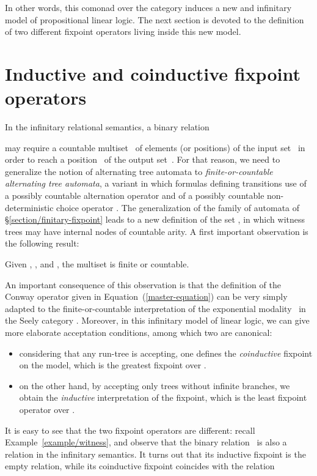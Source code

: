 \documentclass[runningheads,a4paper]{llncs}
\begin{document}
\noindent
In other words, this comonad  over the category  induces a new and infinitary model of propositional linear logic. 
The next section is devoted to the definition of two different fixpoint operators living inside this new model.



\section{Inductive and coinductive fixpoint operators}\label{section/inductive-and-coinductive}
In the infinitary relational semantics, a binary relation 

may require a countable multiset~ of elements (or positions) of the input set~
in order to reach a position~ of the output set~. 
For that reason, we need to generalize the notion of alternating tree automata to \emph{finite-or-countable alternating tree automata}, 
a variant in which formulas defining transitions use of a possibly countable alternation operator  
and of a possibly countable non-deterministic choice operator .
The generalization of the family of automata  of \S\ref{section/finitary-fixpoint} leads to a new definition of the set , in which witness trees may have internal nodes of countable arity.
A first important observation is the following result:

\begin{property}
Given , , and , the multiset  is finite or countable.
\end{property}
An important consequence of this observation is that the definition of the Conway operator  given in Equation~(\ref{master-equation}) 
can be very simply adapted to the finite-or-countable interpretation of the exponential modality~ in the Seely category .
Moreover, in this infinitary model of linear logic, we can give more elaborate acceptation conditions, among which two are canonical:
\begin{itemize}
\item considering that any run-tree is accepting, one defines the \emph{coinductive} fixpoint on the model, which is the greatest fixpoint over .
\item on the other hand, by accepting only trees without infinite branches, we obtain the \emph{inductive} interpretation of the fixpoint,
which is the least fixpoint operator over .
\end{itemize}

It is easy to see that the two fixpoint operators are different: recall Example~\ref{example/witness},
and observe that the binary relation~ is also a relation in the infinitary semantics.
It turns out that its inductive fixpoint is the empty relation, while its coinductive fixpoint coincides with the relation
\end{document}

